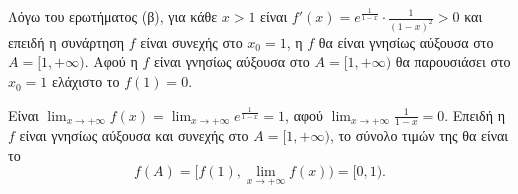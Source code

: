 \begin{alist}
    \item Λόγω του ερωτήματος (β), για κάθε $x > 1$ είναι $f'(x) = e^{\frac{1}{1-x}} \cdot \frac{1}{(1-x)^2} > 0$ και επειδή η συνάρτηση $f$ είναι συνεχής στο $x_0 = 1$, η $f$ θα είναι γνησίως αύξουσα στο $A = [1, +\infty)$.
    Αφού η $f$ είναι γνησίως αύξουσα στο $A = [1, +\infty)$ θα παρουσιάσει στο $x_0 = 1$ ελάχιστο το $f(1) = 0$. 

    \item Είναι $\lim_{x \to +\infty} f(x) = \lim_{x \to +\infty} e^{\frac{1}{1-x}} = 1$, αφού $\lim_{x \to +\infty} \frac{1}{1-x} = 0$. Επειδή η $f$ είναι γνησίως αύξουσα και συνεχής στο $A = [1, +\infty)$, το σύνολο τιμών της θα είναι το
    \[ f(A) = [f(1), \lim_{x \to +\infty} f(x)) = [0, 1). \] 
\end{alist}
